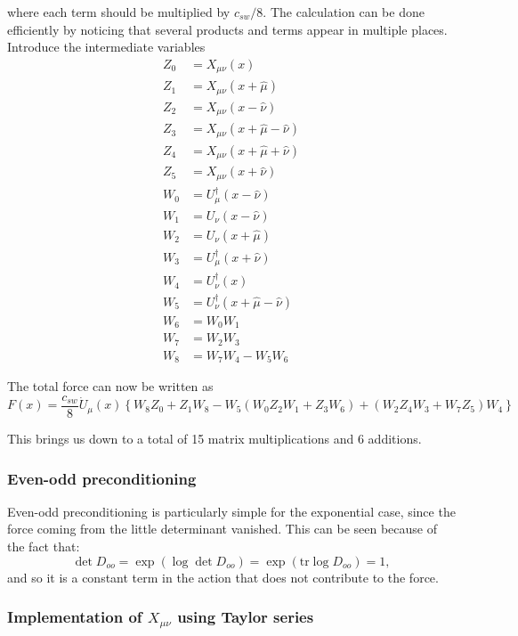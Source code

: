 \documentclass[12pt]{article}
\newcommand{\tr}{\mathrm{tr}}
\begin{document}
where each term should be multiplied by $c_{sw}/8$. The calculation can be done efficiently by noticing that several products and terms appear in multiple places. Introduce the intermediate variables
\begin{align}
 Z_0 &= X_{\mu\nu}(x) \\
 Z_1 &= X_{\mu\nu}(x+\hat{\mu}) \\
 Z_2 &= X_{\mu\nu}(x-\hat{\nu}) \\
 Z_3 &= X_{\mu\nu}(x+\hat{\mu}-\hat{\nu}) \\
 Z_4 &= X_{\mu\nu}(x+\hat{\mu}+\hat{\nu}) \\
 Z_5 &= X_{\mu\nu}(x+\hat{\nu}) \\
 W_0 &= U_\mu^\dagger(x-\hat{\nu}) \\
 W_1 &= U_\nu(x-\hat{\nu}) \\
 W_2 &= U_\nu(x+\hat{\mu}) \\
 W_3 &= U_\mu^\dagger(x+\hat{\nu}) \\
 W_4 &= U_\nu^\dagger(x) \\
 W_5 &= U_\nu^\dagger(x+\hat{\mu}-\hat{\nu}) \\
 W_6 &= W_0W_1 \\
 W_7 &= W_2W_3 \\
 W_8 &= W_7W_4-W_5W_6
\end{align}

The total force can now be written as
\begin{equation}
 F(x) = \frac{c_{sw}}{8}\dot{U}_\mu(x)\left\{W_8Z_0 + Z_1W_8 - W_5(W_0Z_2W_1+Z_3W_6) + (W_2Z_4W_3+W_7Z_5)W_4\right\}
\end{equation}

This brings us down to a total of 15 matrix multiplications and 6 additions.

\subsubsection*{Even-odd preconditioning}

Even-odd preconditioning is particularly simple for the exponential case, since the force coming from the little determinant vanished. This can be seen because of the fact that:
\begin{equation}
\det D_{oo}  = \exp(\log \det D_{oo} ) =\exp( \tr \log D_{oo}) =  1,
\end{equation}
and so it is a constant term in the action that does not contribute to the force. 

\subsubsection*{Implementation of  $X_{\mu\nu}$  using Taylor series}
\end{document}
